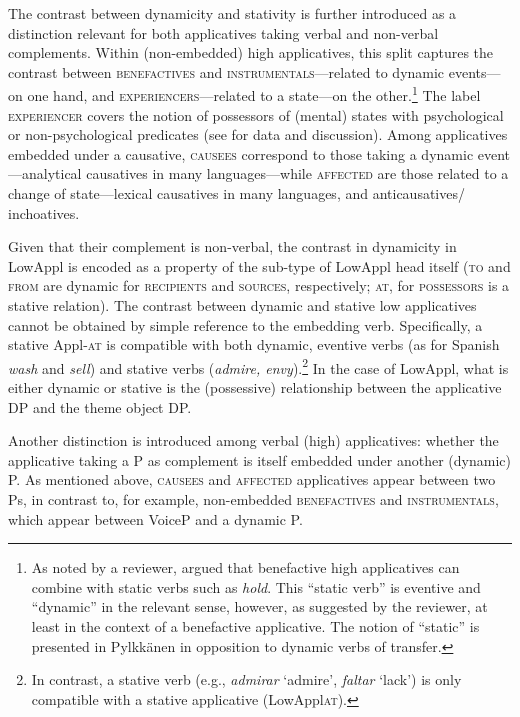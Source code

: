 \documentclass[output=paper,colorlinks,citecolor=brown,nonflat]{./langscibook}
\begin{document}
The contrast between dynamicity and stativity is further introduced as a distinction relevant for both applicatives taking verbal and non-verbal complements. Within (non-embedded) high applicatives, this split captures the contrast between \textsc{benefactives} and \textsc{instrumentals}—related to dynamic events—on one hand, and \textsc{experiencers}—related to a state—on the other.\footnote{As noted by a reviewer, \citet{Pylkkänen2008} argued that benefactive high applicatives can combine with static verbs such as \textit{hold}. This “static verb” is eventive and “dynamic” in the relevant sense, however, as suggested by the reviewer, at least in the context of a benefactive applicative. The notion of “static” is presented in Pylkkänen in opposition to dynamic verbs of transfer.} The label \textsc{experiencer} covers the notion of possessors of (mental) states with psychological or non-psychological predicates (see  for data and discussion). Among applicatives embedded under a causative, \textsc{causees} correspond to those taking a dynamic event—analytical causatives in many languages—while \textsc{affected} are those related to a change of state—lexical causatives in many languages, and anticausatives/ inchoatives.

Given that their complement is non-verbal, the contrast in dynamicity in LowAppl is encoded as a property of the sub-type of LowAppl head itself (\textsc{to} and \textsc{from} are dynamic for \textsc{recipients} and \textsc{sources}, respectively; \textsc{at}, for \textsc{possessors} is a stative relation). The contrast between dynamic and stative low applicatives cannot be obtained by simple reference to the embedding verb. Specifically, a stative Appl-\textsc{at} is compatible with both dynamic, eventive verbs (as for Spanish \textit{wash} and \textit{sell}) and stative verbs (\textit{admire, envy}).\footnote{In contrast, a stative verb (e.g., \textit{admirar} ‘admire’, \textit{faltar} ‘lack’) is only compatible with a stative applicative (LowAppl\textsc{at}).}  In the case of LowAppl, what is either dynamic or stative is the (possessive) relationship between the applicative DP and the theme object DP.

Another distinction is introduced among verbal (high) applicatives: whether the applicative taking a \liv P as complement is itself embedded under another (dynamic) \liv P. As mentioned above, \textsc{causees} and \textsc{affected} applicatives appear between two \liv Ps, in contrast to, for example, non-embedded \textsc{benefactives} and \textsc{instrumentals}, which appear between VoiceP and a dynamic \liv P.
\end{document}

